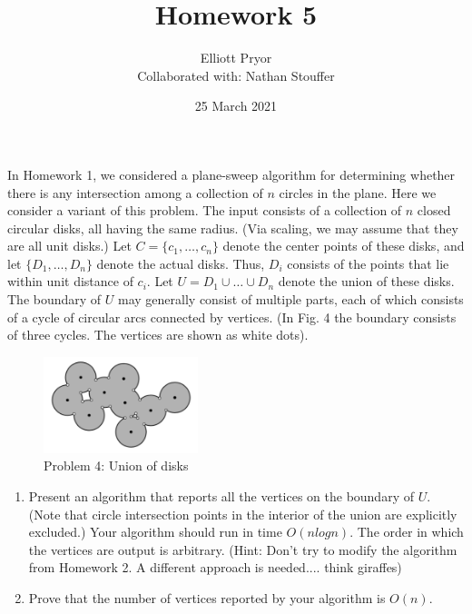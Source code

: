 \documentclass[11pt]{article}
\title{Homework 5}
\author{Elliott Pryor \\
Collaborated with: Nathan Stouffer}
\date{25 March 2021}
\begin{document}
\maketitle



In Homework 1, we considered a plane-sweep algorithm for determining whether
there is any intersection among a collection of $n$ circles in the plane. Here
we consider a variant of this problem. The input consists of a collection of $n$
closed circular disks, all having the same radius. (Via scaling, we may assume
that they are all unit disks.) Let $C = \{c_1, \ldots , c_n\}$ denote the center
points of these disks, and let $\{D_1, \ldots, D_n\}$ denote the actual disks.
Thus, $D_i$ consists of the points that lie within unit distance of $c_i$. Let
$U = D_1 \cup \ldots \cup D_n$ denote the union of these disks. The boundary of
$U$ may generally consist of multiple parts, each of which consists of a cycle
of circular arcs connected by vertices. (In Fig. 4 the boundary consists of
three cycles. The vertices are shown as white dots).

\begin{figure}[h]
    \centering
    \includegraphics[width=0.4\textwidth]{union-of-disks}
    \caption{Problem 4: Union of disks}
\end{figure}

\begin{enumerate}

    \item Present an algorithm that reports all the vertices on the boundary of
        $U$. (Note that circle intersection points in the interior of the union
        are explicitly excluded.) Your algorithm should run in time $O(n log
        n)$.  The order in which the vertices are output is arbitrary. (Hint:
        Don't try to modify the algorithm from Homework 2. A different approach
        is needed.... think giraffes)

    \item Prove that the number of vertices reported by your algorithm is
        $O(n)$.

\end{enumerate}
\end{document}
